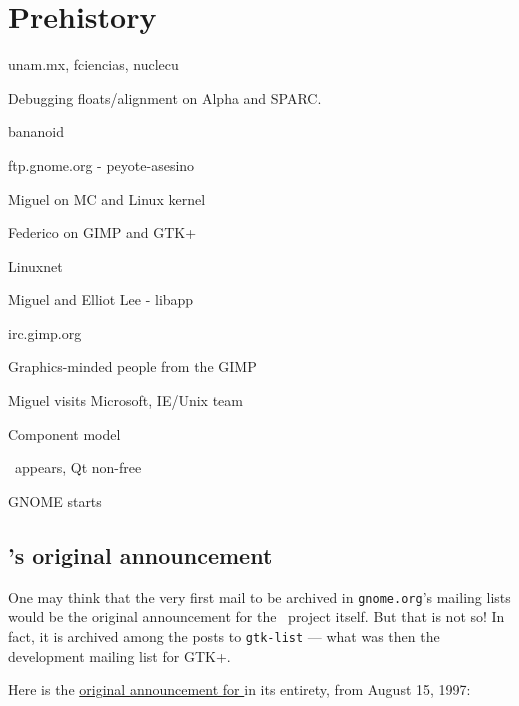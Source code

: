\chapter{Prehistory}


unam.mx, fciencias, nuclecu

Debugging floats/alignment on Alpha and SPARC.

bananoid

ftp.gnome.org - peyote-asesino

Miguel on MC and Linux kernel

Federico on GIMP and GTK+

Linuxnet

Miguel and Elliot Lee - libapp

irc.gimp.org

Graphics-minded people from the GIMP

Miguel visits Microsoft, IE/Unix team

Component model

\KDE\ appears, Qt non-free

GNOME starts

\section{\GNOME's original announcement}

One may think that the very first mail to be archived in {\tt gnome.org}'s mailing
lists would be the original announcement for the \GNOME\ project
itself.  But that is not so!  In fact, it is archived among the posts
to {\tt gtk-list} --- what was then the development mailing list for
GTK+.

Here is the
\href{https://mail.gnome.org/archives/gtk-list/1997-August/msg00123.html}{original
announcement for \GNOME} in its entirety, from August 15, 1997:

